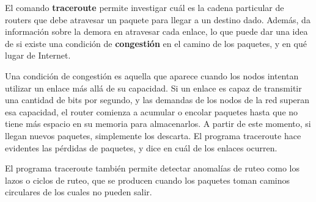 \documentclass[spanish,A4,]{article}
\begin{document}
El comando \textbf{traceroute} permite investigar cuál es la cadena
particular de routers que debe atravesar un paquete para llegar a un
destino dado. Además, da información sobre la demora en atravesar cada
enlace, lo que puede dar una idea de si existe una condición de
\textbf{congestión} en el camino de los paquetes, y en qué lugar de
Internet.

Una condición de congestión es aquella que aparece cuando los nodos
intentan utilizar un enlace más allá de su capacidad. Si un enlace es
capaz de transmitir una cantidad de bits por segundo, y las demandas de
los nodos de la red superan esa capacidad, el router comienza a acumular
o encolar paquetes hasta que no tiene más espacio en su memoria para
almacenarlos. A partir de este momento, si llegan nuevos paquetes,
simplemente los descarta. El programa traceroute hace evidentes las
pérdidas de paquetes, y dice en cuál de los enlaces ocurren.

El programa traceroute también permite detectar anomalías de ruteo como
los lazos o ciclos de ruteo, que se producen cuando los paquetes toman
caminos circulares de los cuales no pueden salir.
\end{document}
